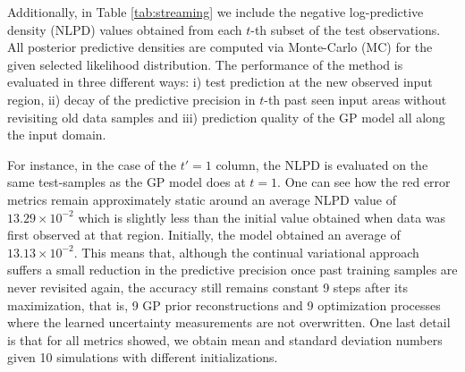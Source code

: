 \documentclass[]{article}
\begin{document}
Additionally, in Table \ref{tab:streaming} we include the negative log-predictive density (NLPD) values obtained from each $t$-th subset of the test observations. All posterior predictive densities are computed via Monte-Carlo (MC) for the given selected likelihood distribution. The performance of the method is evaluated in three different ways: i) test prediction at the new observed input region, ii) decay of the predictive precision in $t$-th past seen input areas without revisiting old data samples and iii) prediction quality of the GP model all along the input domain. 


For instance, in the case of the $t'=1$ column, the NLPD is evaluated on the same test-samples as the GP model does at $t=1$. One can see how the red error metrics remain approximately static around an average NLPD value of $13.29\times 10^{-2}$ which is slightly less than the initial value obtained when data was first observed at that region. Initially, the model obtained an average of $13.13\times 10^{-2}.$ This means that, although the continual variational approach suffers a small reduction in the predictive precision once past training samples are never revisited again, the accuracy still remains constant 9 steps after its maximization, that is, 9 GP prior reconstructions and 9 optimization processes where the learned uncertainty measurements are not overwritten. One last detail is that for all metrics showed, we obtain mean and standard deviation numbers given 10 simulations with different initializations.
\end{document}
